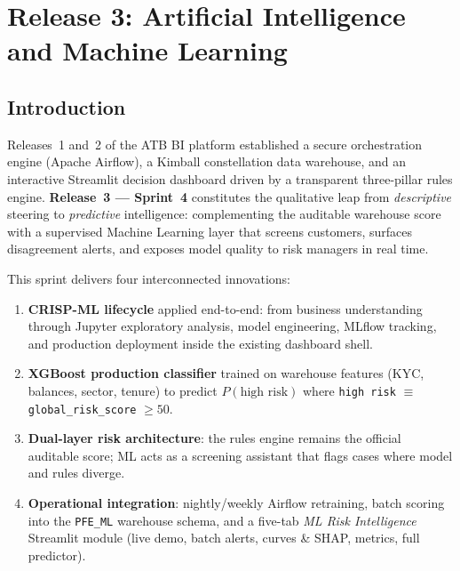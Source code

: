 \chapter{Release 3: Artificial Intelligence and Machine Learning}
\label{chap:release3}

\section{Introduction}
Releases~1 and~2 of the ATB BI platform established a secure orchestration engine
(Apache Airflow), a Kimball constellation data warehouse, and an
interactive Streamlit decision dashboard driven by a transparent three-pillar rules
engine. \textbf{Release~3 --- Sprint~4} constitutes the qualitative leap from
\emph{descriptive} steering to \emph{predictive} intelligence: complementing the
auditable warehouse score with a supervised Machine Learning layer that screens
customers, surfaces disagreement alerts, and exposes model quality to risk managers
in real time.

This sprint delivers four interconnected innovations:
\begin{enumerate}
    \item \textbf{CRISP-ML lifecycle} applied end-to-end: from business understanding
          through Jupyter exploratory analysis, model engineering, MLflow tracking,
          and production deployment inside the existing dashboard shell.
    \item \textbf{XGBoost production classifier} trained on warehouse features
          (KYC, balances, sector, tenure) to predict $P(\text{high risk})$ where
          \texttt{high risk} $\equiv$ \texttt{global\_risk\_score} $\geq 50$.
    \item \textbf{Dual-layer risk architecture}: the rules engine remains the official
          auditable score; ML acts as a screening assistant that flags cases where
          model and rules diverge.
    \item \textbf{Operational integration}: nightly/weekly Airflow retraining,
          batch scoring into the \texttt{PFE\_ML} warehouse schema, and a
          five-tab \emph{ML Risk Intelligence} Streamlit module (live demo, batch
          alerts, curves \& SHAP, metrics, full predictor).
\end{enumerate}

